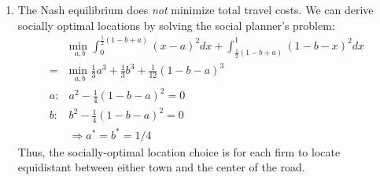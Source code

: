 \documentclass{article}
\newcommand{\usmin}[1]{\underset{#1}{\text{min }}}
\begin{document}
\begin{enumerate}
\begin{enumerate}
    \item The Nash equilibrium does \textit{not} minimize total travel costs. We can derive socially optimal locations by solving the social planner's problem:
      \begin{align*} 
          &\usmin{a,b} \int_0^{\frac{1}{2}(1-b+a)}(x-a)^2dx + \int^1_{\frac{1}{2}(1-b+a)}(1-b-x)^2dx  \\
        = &\usmin{a,b} \frac{1}{3}a^3 + \frac{1}{3}b^3 + \frac{1}{12}(1-b-a)^3                        \\
        a: & a^2 - \frac{1}{4}(1-b-a)^2 = 0                                                           \\
        b: & b^2 - \frac{1}{4}(1-b-a)^2 = 0                                                           \\
        &\Rightarrow a^*=b^*=1/4
      \end{align*}
      Thus, the socially-optimal location choice is for each firm to locate equidistant between either town and the center of the road.
  \end{enumerate}
\end{enumerate}

\end{document}

